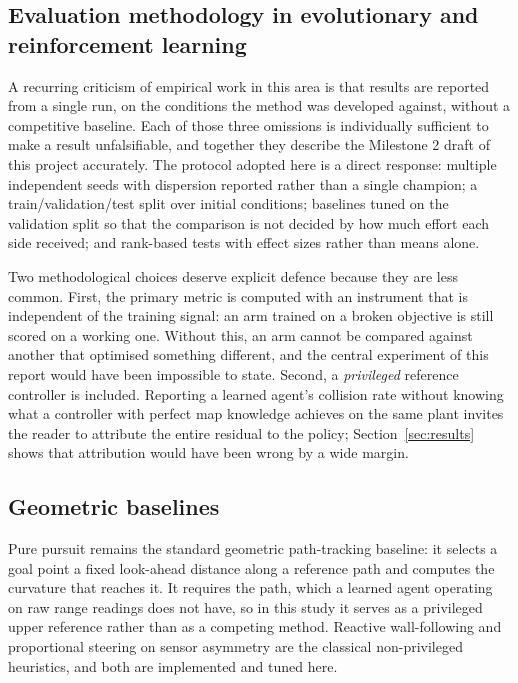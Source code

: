 \documentclass[conference]{IEEEtran}
\begin{document}
\subsection{Evaluation methodology in evolutionary and reinforcement learning}

A recurring criticism of empirical work in this area is that results are reported from a single run, on the conditions the method was developed against, without a competitive baseline. Each of those three omissions is individually sufficient to make a result unfalsifiable, and together they describe the Milestone 2 draft of this project accurately. The protocol adopted here is a direct response: multiple independent seeds with dispersion reported rather than a single champion; a train/validation/test split over initial conditions; baselines tuned on the validation split so that the comparison is not decided by how much effort each side received; and rank-based tests with effect sizes rather than means alone.

Two methodological choices deserve explicit defence because they are less common. First, the primary metric is computed with an instrument that is independent of the training signal: an arm trained on a broken objective is still scored on a working one. Without this, an arm cannot be compared against another that optimised something different, and the central experiment of this report would have been impossible to state. Second, a \emph{privileged} reference controller is included. Reporting a learned agent's collision rate without knowing what a controller with perfect map knowledge achieves on the same plant invites the reader to attribute the entire residual to the policy; Section~\ref{sec:results} shows that attribution would have been wrong by a wide margin.

\subsection{Geometric baselines}

Pure pursuit \cite{coulter} remains the standard geometric path-tracking baseline: it selects a goal point a fixed look-ahead distance along a reference path and computes the curvature that reaches it. It requires the path, which a learned agent operating on raw range readings does not have, so in this study it serves as a privileged upper reference rather than as a competing method. Reactive wall-following and proportional steering on sensor asymmetry are the classical non-privileged heuristics, and both are implemented and tuned here.
\end{document}
